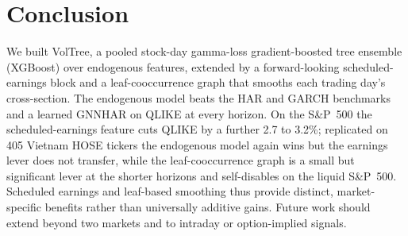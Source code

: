 \documentclass[runningheads]{llncs}
\begin{document}
\section{Conclusion}
We built VolTree, a pooled stock-day gamma-loss gradient-boosted tree ensemble (XGBoost) over endogenous
features, extended by a forward-looking scheduled-earnings block and a leaf-cooccurrence graph that smooths
each trading day's cross-section. The endogenous model beats the HAR and GARCH benchmarks and a learned
GNNHAR on QLIKE at every horizon. On the S\&P~500 the scheduled-earnings feature cuts QLIKE by a further
2.7 to 3.2\%; replicated on 405 Vietnam HOSE tickers the endogenous model again wins but the earnings lever
does not transfer, while the leaf-cooccurrence graph is a small but significant lever at the shorter
horizons and self-disables on the liquid S\&P~500. Scheduled earnings and leaf-based smoothing thus provide
distinct, market-specific benefits rather than universally additive gains. Future work should extend beyond
two markets and to intraday or option-implied signals.
\end{document}
